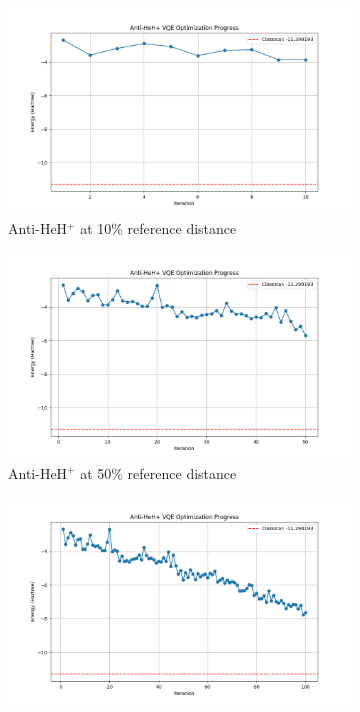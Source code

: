 \documentclass[10pt,twocolumn,a4paper]{article}
\begin{document}
\begin{figure}[t!]
    \centering
    \begin{subfigure}[b]{0.32\textwidth}
        \includegraphics[width=\textwidth]{graphs/vqe_progress_anti_heh+_10.png}
        \caption{Anti-HeH$^+$ at 10\% reference distance}
        \label{fig:vqe_progress_anti_10}
    \end{subfigure}
    \hfill
    \begin{subfigure}[b]{0.32\textwidth}
        \includegraphics[width=\textwidth]{graphs/vqe_progress_anti_heh+_50.png}
        \caption{Anti-HeH$^+$ at 50\% reference distance}
        \label{fig:vqe_progress_anti_50}
    \end{subfigure}
    \hfill
    \begin{subfigure}[b]{0.32\textwidth}
        \includegraphics[width=\textwidth]{graphs/vqe_progress_anti_heh+_100.png}

\end{subfigure}
\end{figure}
\end{document}
